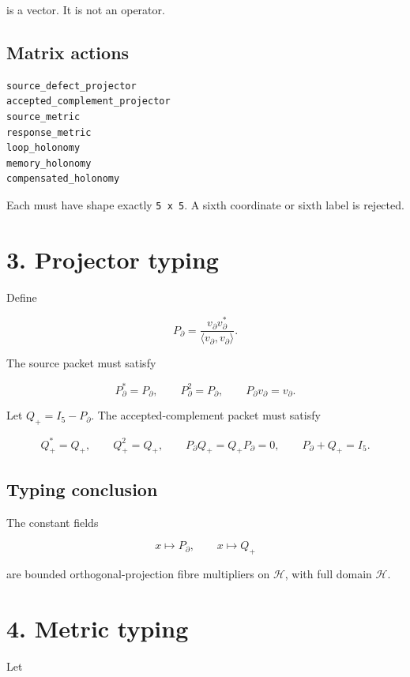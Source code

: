 is a vector. It is not an operator.

\hypertarget{matrix-actions}{%
\subsection{Matrix actions}\label{matrix-actions}}

\begin{verbatim}
source_defect_projector
accepted_complement_projector
source_metric
response_metric
loop_holonomy
memory_holonomy
compensated_holonomy
\end{verbatim}

Each must have shape exactly \texttt{5\ x\ 5}. A sixth coordinate or sixth label is
rejected.

\hypertarget{projector-typing}{%
\section{3. Projector typing}\label{projector-typing}}

Define

\[
P_\partial
=
\frac{v_\partial v_\partial^*}
{\langle v_\partial,v_\partial\rangle}.
\]

The source packet must satisfy

\[
P_\partial^*=P_\partial,
\qquad
P_\partial^2=P_\partial,
\qquad
P_\partial v_\partial=v_\partial.
\]

Let \(Q_+=I_5-P_\partial\). The accepted-complement packet must satisfy

\[
Q_+^*=Q_+,
\qquad
Q_+^2=Q_+,
\qquad
P_\partial Q_+=Q_+P_\partial=0,
\qquad
P_\partial+Q_+=I_5.
\]

\hypertarget{typing-conclusion}{%
\subsection{Typing conclusion}\label{typing-conclusion}}

The constant fields

\[
x\mapsto P_\partial,
\qquad
x\mapsto Q_+
\]

are bounded orthogonal-projection fibre multipliers on \(\mathcal H\), with
full domain \(\mathcal H\).

\hypertarget{metric-typing}{%
\section{4. Metric typing}\label{metric-typing}}

Let

